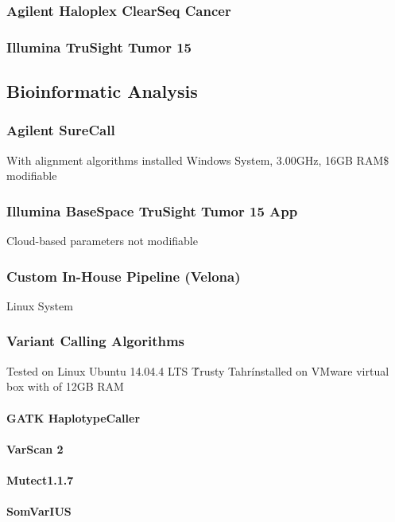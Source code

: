 \subsubsection{Agilent Haloplex ClearSeq Cancer}

\subsubsection{Illumina TruSight Tumor 15}

\subsection{Bioinformatic Analysis}

\subsubsection{Agilent SureCall}
With alignment algorithms installed
Windows System, 3.00GHz, 16GB RAM\$
modifiable
\subsubsection{Illumina BaseSpace TruSight Tumor 15 App}
Cloud-based
parameters not modifiable
\subsubsection{Custom In-House Pipeline (Velona)}
Linux System
\subsubsection{Variant Calling Algorithms}
Tested on Linux Ubuntu 14.04.4 LTS \'Trusty Tahr\' installed on VMware virtual box
with of 12GB RAM
\paragraph{GATK HaplotypeCaller}
\paragraph{VarScan 2}
\paragraph{Mutect1.1.7}
{\cite{mutect:2013}}
\paragraph{SomVarIUS}
\newpage

